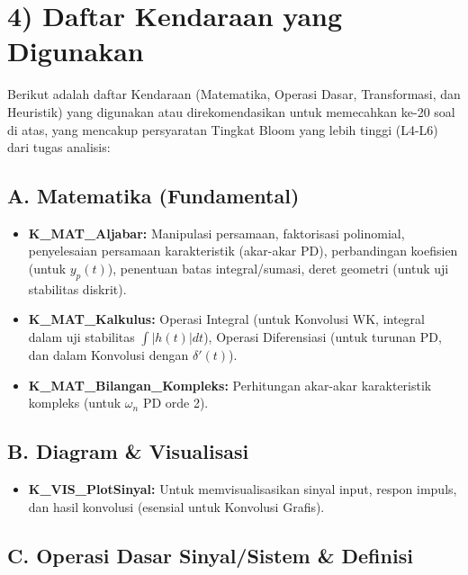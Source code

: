 \documentclass[
  letterpaper,
  DIV=11,
  numbers=noendperiod]{scrreprt}
\providecommand{\tightlist}{%
  \setlength{\itemsep}{0pt}\setlength{\parskip}{0pt}}
\begin{document}
\chapter{4) Daftar Kendaraan yang
Digunakan}\label{daftar-kendaraan-yang-digunakan-1}

Berikut adalah daftar Kendaraan (Matematika, Operasi Dasar,
Transformasi, dan Heuristik) yang digunakan atau direkomendasikan untuk
memecahkan ke-20 soal di atas, yang mencakup persyaratan Tingkat Bloom
yang lebih tinggi (L4-L6) dari tugas analisis:

\section{A. Matematika (Fundamental)}\label{a.-matematika-fundamental}

\begin{itemize}
\tightlist
\item
  \textbf{K\_MAT\_Aljabar:} Manipulasi persamaan, faktorisasi
  polinomial, penyelesaian persamaan karakteristik (akar-akar PD),
  perbandingan koefisien (untuk \(y_p(t)\)), penentuan batas
  integral/sumasi, deret geometri (untuk uji stabilitas diskrit).
\item
  \textbf{K\_MAT\_Kalkulus:} Operasi Integral (untuk Konvolusi WK,
  integral dalam uji stabilitas \(\int |h(t)| dt\)), Operasi
  Diferensiasi (untuk turunan PD, dan dalam Konvolusi dengan
  \(\delta'(t)\)).
\item
  \textbf{K\_MAT\_Bilangan\_Kompleks:} Perhitungan akar-akar
  karakteristik kompleks (untuk \(\omega_n\) PD orde 2).
\end{itemize}

\section{B. Diagram \& Visualisasi}\label{b.-diagram-visualisasi}

\begin{itemize}
\tightlist
\item
  \textbf{K\_VIS\_PlotSinyal:} Untuk memvisualisasikan sinyal input,
  respon impuls, dan hasil konvolusi (esensial untuk Konvolusi Grafis).
\end{itemize}

\section{C. Operasi Dasar Sinyal/Sistem \&
Definisi}\label{c.-operasi-dasar-sinyalsistem-definisi}
\end{document}
